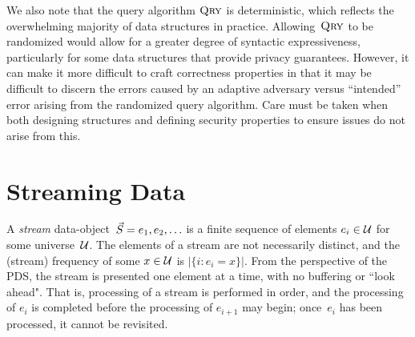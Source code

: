 We also note that the query algorithm $\textnormal{\textsc{Qry}}$ is deterministic, which reflects the overwhelming majority of data structures in practice. Allowing~$\textnormal{\textsc{Qry}}$ to be randomized would allow for a greater degree of syntactic expressiveness, particularly for some data structures that provide privacy guarantees. However, it can make it more difficult to craft correctness properties in that it may be difficult to discern the errors caused by an adaptive adversary versus ``intended'' error arising from the randomized query algorithm. Care must be taken when both designing structures and defining security properties to ensure issues do not arise from this.  


\section{Streaming Data}

A \emph{stream} data-object~$\vec{S} = e_1,e_2,\ldots$ is a finite sequence of elements $e_i \in \mathcal{U}$ for some universe~$\mathcal{U}$.  
The elements of a stream are not necessarily distinct, and the (stream) frequency of some $x \in \mathcal{U}$ is $|\{i: e_i=x \}|$.  
From the perspective of the PDS, the stream is presented one element at a time, with no buffering or ``look ahead".  
That is, processing of a stream is performed in order, and the processing of $e_i$ is completed before the processing of $e_{i+1}$ may begin; once~$e_i$ has been processed, it cannot be revisited.
